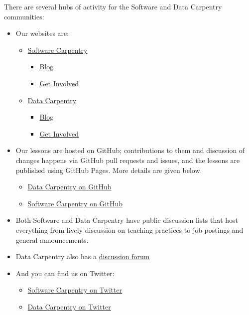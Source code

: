 There are several hubs of activity for the Software and Data Carpentry
communities:

\begin{itemize}
\item
  Our websites are:

  \begin{itemize}
    \item
    \href{http://software-carpentry.org}{Software Carpentry}

    \begin{itemize}
        \item
      \href{http://software-carpentry.org/blog/}{Blog}
    \item
      \href{http://software-carpentry.org/join/}{Get Involved}
    \end{itemize}
  \item
    \href{http://datacarpentry.org}{Data Carpentry}

    \begin{itemize}
        \item
      \href{http://datacarpentry.org/blog/}{Blog}
    \item
      \href{http://datacarpentry.org/involved/}{Get Involved}
    \end{itemize}
  \end{itemize}
\item
  Our lessons are hosted on GitHub; contributions to them and discussion
  of changes happens via GitHub pull requests and issues, and the
  lessons are published using GitHub Pages. More details are given
  below.

  \begin{itemize}
    \item
    \href{https://github.com/datacarpentry}{Data Carpentry on GitHub}
  \item
    \href{https://github.com/swcarpentry}{Software Carpentry on GitHub}
  \end{itemize}
\item
  Both Software and Data Carpentry have public discussion lists that
  host everything from lively discussion on teaching practices to job
  postings and general announcements.
\item
  Data Carpentry also has a
  \href{http://discuss.datacarpentry.org/}{discussion forum}
\item
  And you can find us on Twitter:

  \begin{itemize}
    \item
    \href{https://twitter.com/swcarpentry}{Software Carpentry on
    Twitter}
  \item
    \href{https://twitter.com/datacarpentry}{Data Carpentry on Twitter}
  \end{itemize}
\end{itemize}

